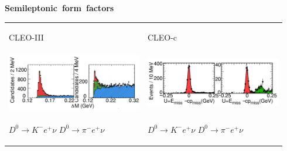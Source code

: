 \documentclass[landscape]{article}
\newenvironment{slide}[1][ ]{\mbox{\bf \boldmath #1 } \vfill}{\vfill \vspace{-1.5 cm} \mbox{ } \pagebreak}
\begin{document}
\begin{slide}[Semileptonic form factors]
\begin{tabular}{p{0.47\linewidth} p{0.47\linewidth}}
  \begin{minipage}{\linewidth}
    \begin{center}
      CLEO-III
    \end{center}
  \end{minipage} & 
  \begin{minipage}{\linewidth}
    \begin{center}
      CLEO-c
    \end{center}
  \end{minipage} \\
  \begin{minipage}{\linewidth}
    \includegraphics[width=\linewidth]{semilep_lauren2}
  \end{minipage} &
  \begin{minipage}{\linewidth}
    \vspace{0.5 cm}

    \includegraphics[width=\linewidth]{semilep_feng2}
  \end{minipage} \\
  \begin{minipage}{\linewidth}
    \begin{center}
      \LARGE \hspace{0.5 cm} $D^0 \to {K^-} e^+ \nu$ \hspace{1 cm} \hspace{0.8 cm} $D^0 \to {\pi^-} e^+ \nu$
    \end{center}
  \end{minipage} & 
  \begin{minipage}{\linewidth}
    \begin{center}
      \LARGE \hspace{0.5 cm} $D^0 \to {K^-} e^+ \nu$ \hspace{1 cm} \hspace{0.5 cm} $D^0 \to {\pi^-} e^+ \nu$
    \end{center}
  \end{minipage}
\end{tabular}


\end{slide}
\end{document}
